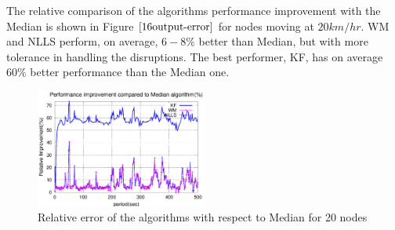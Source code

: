 \documentclass[journal]{IEEEtran}
\begin{document}
\par
The relative comparison of the algorithms performance improvement with the Median is shown in Figure $\ref{16output-error}$ for nodes moving at $20km/hr$. WM and NLLS perform, on average, $6-8\%$ better than Median, but with more tolerance in handling the disruptions. The best performer, KF, has on average $60\%$ better performance than the Median one.
\begin{figure}
\centering \includegraphics[width=0.5\textwidth]{16output-error}
\caption{Relative error of the algorithms with respect to Median for 20 nodes}
\label{16output-error}
\end{figure}
\end{document}
